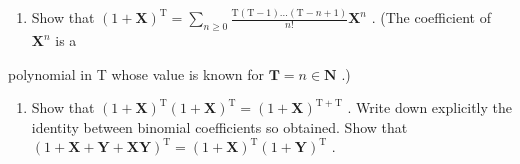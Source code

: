 \begin{enumerate}
\def\labelenumi{\alph{enumi})}
\tightlist
\item
  Show that \((1 + \mathbf{X})^{\mathrm{T}} = \sum_{n\geqslant 0}\frac{\mathrm{T}(\mathrm{T} - 1)\dots(\mathrm{T} - n + 1)}{n!}\mathbf{X}^{n}\) . (The coefficient of \(\mathbf{X}^n\) is a
\end{enumerate}

polynomial in T whose value is known for \(\mathbf{T} = n\in \mathbf{N}\) .)

\begin{enumerate}
\def\labelenumi{\alph{enumi})}
\setcounter{enumi}{1}
\tightlist
\item
  Show that \((1 + \mathbf{X})^{\mathrm{T}}(1 + \mathbf{X})^{\mathrm{T}} = (1 + \mathbf{X})^{\mathrm{T} + \mathrm{T}}\) . Write down explicitly the identity between binomial coefficients so obtained. Show that \((1 + \mathbf{X} + \mathbf{Y} + \mathbf{XY})^{\mathrm{T}} = (1 + \mathbf{X})^{\mathrm{T}}(1 + \mathbf{Y})^{\mathrm{T}}\) .
\end{enumerate}

